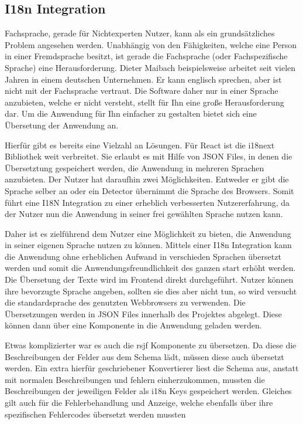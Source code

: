 \subsection{I18n Integration}
Fachsprache, gerade für Nichtexperten Nutzer, kann als ein grundsätzliches Problem angesehen werden. Unabhängig von den Fähigkeiten, welche eine Person in einer Fremdsprache besitzt, ist gerade die Fachsprache (oder Fachspezifische Sprache) eine Herausforderung.
Dieter Maibach beispielsweise arbeitet seit vielen Jahren in einem deutschen Unternehmen. Er kann englisch sprechen, aber ist nicht mit der Fachsprache vertraut. Die Software daher nur in einer Sprache anzubieten, welche er nicht versteht, stellt für Ihn eine große Herausforderung dar.
Um die Anwendung für Ihn einfacher zu gestalten bietet sich eine Übersetung der Anwendung an.

Hierfür gibt es bereits eine Vielzahl an Lösungen. Für React ist die i18next Bibliothek weit verbreitet. Sie erlaubt es mit Hilfe von JSON Files, in denen die Übersetztung gespeichert werden, die Anwendung in mehreren Sprachen anzubieten.
Der Nutzer hat daraufhin zwei Möglichkeiten. Entweder er gibt die Sprache selber an oder ein Detector übernimmt die Sprache des Browsers.
Somit führt eine I18N Integration zu einer erheblich verbesserten Nutzererfahrung, da der Nutzer nun die Anwendung in seiner frei gewählten Sprache nutzen kann.

Daher ist es zielführend dem Nutzer eine Möglichkeit zu bieten, die Anwendung in seiner eigenen Sprache nutzen zu können.
Mittels einer I18n Integration kann die Anwendung ohne erheblichen Aufwand in verschieden Sprachen übersetzt werden und somit die Anwendungsfreundlichkeit des ganzen start erhöht werden. 
Die Übersetung der Texte wird im Frontend direkt durchgeführt. Nutzer können ihre bevorzugte Sprache angeben, sollten sie dies aber nicht tun, so wird versucht die standardsprache des genutzten Webbrowsers zu verwenden.
Die Übersetzungen werden in JSON Files innerhalb des Projektes abgelegt. Diese können dann über eine Komponente in die Anwendung geladen werden. 

Etwas komplizierter war es auch die rsjf Komponente zu übersetzen. Da diese die Beschreibungen der Felder aus dem Schema lädt, müssen diese auch übersetzt werden.
Ein extra hierfür geschriebener Konvertierer liest die Schema aus, anstatt mit normalen Beschreibungen und fehlern einherzukommen, mussten die Beschreibungen der jeweiligen Felder als i18n Keys gespeichert werden.
Gleiches gilt auch für die Fehlerbehandlung und Anzeige, welche ebenfalls über ihre spezifischen Fehlercodes übersetzt werden mussten

